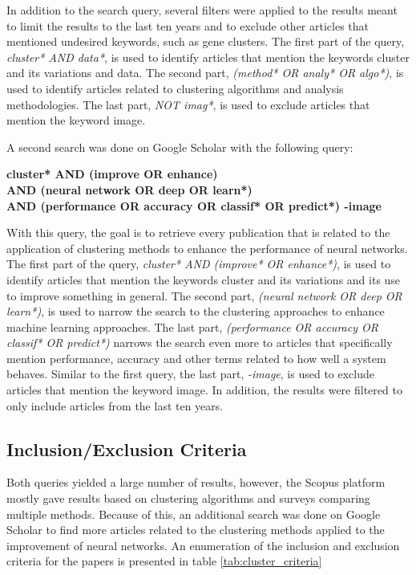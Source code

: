 In addition to the search query, several filters were applied to the results meant to limit the results to the last ten years and to exclude other articles that mentioned undesired keywords, such as gene clusters. The first part of the query, \textit{cluster* AND data*}, is used to identify articles that mention the keywords cluster and its variations and data. The second part, \textit{(method* OR analy* OR algo*)}, is used to identify articles related to clustering algorithms and analysis methodologies. The last part, \textit{NOT imag*}, is used to exclude articles that mention the keyword image.

A second search was done on Google Scholar with the following query:
\begin{center}
    \textbf{cluster* AND (improve OR enhance) \\AND (neural network OR deep OR learn*) \\AND (performance OR accuracy OR classif* OR predict*) -image}
\end{center}

With this query, the goal is to retrieve every publication that is related to the application of clustering methods to enhance the performance of neural networks. The first part of the query, \textit{cluster* AND (improve* OR enhance*)}, is used to identify articles that mention the keywords cluster and its variations and its use to improve something in general. The second part, \textit{(neural network OR deep OR learn*)}, is used to narrow the search to the clustering approaches to enhance machine learning approaches. The last part, \textit{(performance OR accuracy OR classif* OR predict*)} narrows the search even more to articles that specifically mention performance, accuracy and other terms related to how well a system behaves. Similar to the first query, the last part, \textit{-image}, is used to exclude articles that mention the keyword image. In addition, the results were filtered to only include articles from the last ten years.


\subsection{Inclusion/Exclusion Criteria}\label{sec:cluster_inclusion_exclusion}
Both queries yielded a large number of results, however, the Scopus platform mostly gave results based on clustering algorithms and surveys comparing multiple methods. Because of this, an additional search was done on Google Scholar to find more articles related to the clustering methods applied to the improvement of neural networks. An enumeration of the inclusion and exclusion criteria for the papers is presented in table \ref{tab:cluster_criteria}

